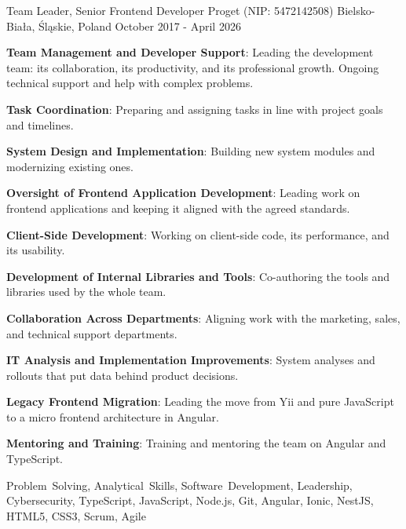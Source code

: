 \begin{cventries}
  \cventry
    {Team Leader, Senior Frontend Developer} %
    {Proget (NIP: 5472142508)} %
    {Bielsko-Biała, Śląskie, Poland} %
    {October 2017 - April 2026} %
    {
      \begin{cvitems} %
        \item {\textbf{Team Management and Developer Support}: Leading the development team: its collaboration, its productivity, and its professional growth. Ongoing technical support and help with complex problems.}
        \item {\textbf{Task Coordination}: Preparing and assigning tasks in line with project goals and timelines.}
        \item {\textbf{System Design and Implementation}: Building new system modules and modernizing existing ones.}
        \item {\textbf{Oversight of Frontend Application Development}: Leading work on frontend applications and keeping it aligned with the agreed standards.}
        \item {\textbf{Client-Side Development}: Working on client-side code, its performance, and its usability.}
        \item {\textbf{Development of Internal Libraries and Tools}: Co-authoring the tools and libraries used by the whole team.}
        \item {\textbf{Collaboration Across Departments}: Aligning work with the marketing, sales, and technical support departments.}
        \item {\textbf{IT Analysis and Implementation Improvements}: System analyses and rollouts that put data behind product decisions.}
        \item {\textbf{Legacy Frontend Migration}: Leading the move from Yii and pure JavaScript to a micro frontend architecture in Angular.}
        \item {\textbf{Mentoring and Training}: Training and mentoring the team on Angular and TypeScript.}
      \end{cvitems}
    }
    {Problem~Solving, Analytical~Skills, Software~Development, Leadership, Cybersecurity, TypeScript, JavaScript, Node.js, Git, Angular, Ionic, NestJS, HTML5, CSS3, Scrum, Agile}


\end{cventries}
